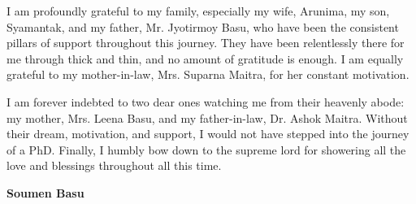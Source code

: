 I am profoundly grateful to my family, especially my wife, Arunima, my son, Syamantak, and my father, Mr. Jyotirmoy Basu, who have been the consistent pillars of support throughout this journey. They have been relentlessly there for me through thick and thin, and no amount of gratitude is enough. I am equally grateful to my mother-in-law, Mrs. Suparna Maitra, for her constant motivation. 

I am forever indebted to two dear ones watching me from their heavenly abode: my mother, Mrs. Leena Basu, and my father-in-law, Dr. Ashok Maitra. Without their dream, motivation, and support, I would not have stepped into the journey of a PhD.  Finally, I humbly bow down to the supreme lord for showering all the love and blessings throughout all this time.

\vspace{2cm}
{ \begin{flushright}{\bf Soumen Basu}\end{flushright} }
